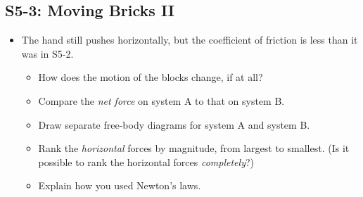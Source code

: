 \documentclass[]{article}
\begin{document}
\begin{PresentSpace}
\vspace{-10pt}
\section*{S5-3: Moving Bricks II}
\vspace{-10pt}
\begin{itemize}
	\item The hand still pushes horizontally, but the coefficient of friction is less than it was in S5-2.
	\begin{center}
	\end{center}
	\begin{itemize}
		\item How does the motion of the blocks change, if at all?
		\item Compare the \textit{net force} on system A to that on system B.
		\item Draw separate free-body diagrams for system A and system B.
		\item Rank the \textit{horizontal} forces by magnitude, from largest to smallest. (Is it possible to rank the horizontal forces \textit{completely}?)
		\item Explain how you used Newton's laws.
	\end{itemize}
\end{itemize}
\end{PresentSpace}
\newpage
\end{document}
